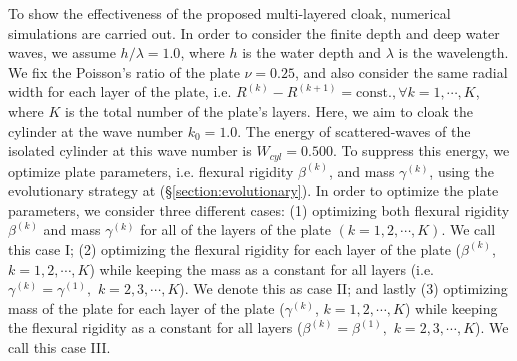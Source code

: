 \documentclass{jfm}
\begin{document}
To show the effectiveness of the proposed multi-layered cloak, numerical simulations are carried out. In order to consider the finite depth and deep water waves, we assume $h/\lambda =1.0$,  where  $h$ is the water depth and  $\lambda$ is the wavelength. We fix the Poisson's ratio of the plate $\nu=0.25$, and also consider the same radial width for each layer of the plate, i.e.  $R^{(k)}-R^{(k+1)} = \text{const.}, \forall k=1,\cdots, K$, where $K$ is the total number of the plate's layers.
Here, we aim to cloak the cylinder at the wave number $k_0=1.0$.
The energy of scattered-waves of the isolated cylinder at this wave number is $W_{cyl}=0.500$.
To suppress this energy, we optimize plate parameters, i.e. flexural rigidity $\beta^{(k)}$, and mass $\gamma^{(k)}$, using the evolutionary strategy at (\S\ref{section:evolutionary}). In order to optimize the plate parameters, we consider three different cases: (1) optimizing both flexural rigidity $\beta^{(k)}$ and mass $\gamma^{(k)}$ for all of the layers of the plate $(k=1,2,\cdots,K)$. We call this case I; (2) optimizing the flexural rigidity for each layer of the plate ($\beta^{(k)}$, $k=1,2,\cdots,K$) while keeping the mass as a constant for all layers (i.e. $\gamma^{(k)}=\gamma^{(1)},$ $k=2,3,\cdots,K$). We denote this as case II; and lastly (3) optimizing mass of the plate for each layer of the plate ($\gamma^{(k)}$, $k=1,2,\cdots,K$) while keeping the flexural rigidity as a  constant for all layers ($\beta^{(k)}=\beta^{(1)},$ $k=2,3,\cdots,K$). We call this case III. 
\end{document}
